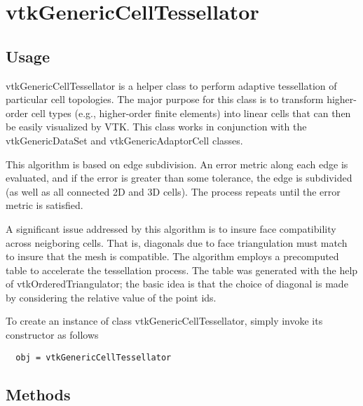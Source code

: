 \section{vtkGenericCellTessellator}

\subsection{Usage}

 vtkGenericCellTessellator is a helper class to perform adaptive tessellation
 of particular cell topologies. The major purpose for this class is to
 transform higher-order cell types (e.g., higher-order finite elements)
 into linear cells that can then be easily visualized by VTK. This class
 works in conjunction with the vtkGenericDataSet and vtkGenericAdaptorCell
 classes.

 This algorithm is based on edge subdivision. An error metric along each
 edge is evaluated, and if the error is greater than some tolerance, the
 edge is subdivided (as well as all connected 2D and 3D cells). The process
 repeats until the error metric is satisfied. 

 A significant issue addressed by this algorithm is to insure face
 compatibility across neigboring cells. That is, diagonals due to face
 triangulation must match to insure that the mesh is compatible. The
 algorithm employs a precomputed table to accelerate the tessellation
 process. The table was generated with the help of vtkOrderedTriangulator;
 the basic idea is that the choice of diagonal is made by considering the
 relative value of the point ids.

To create an instance of class vtkGenericCellTessellator, simply
invoke its constructor as follows
\begin{verbatim}
  obj = vtkGenericCellTessellator
\end{verbatim}
\subsection{Methods}

